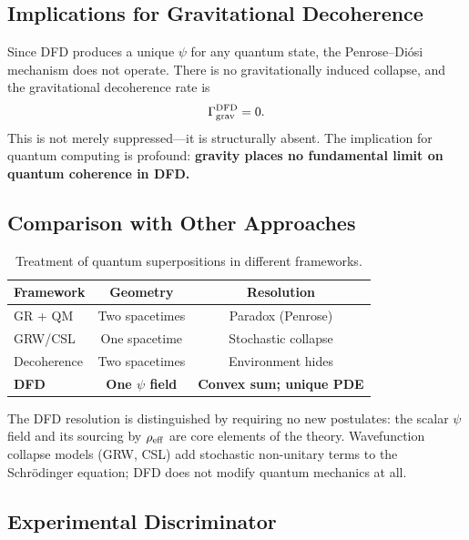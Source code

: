 \documentclass[aps,prd,twocolumn,superscriptaddress,nofootinbib]{revtex4-2}
\begin{document}
\subsection{Implications for Gravitational Decoherence}

Since DFD produces a unique $\psi$ for any quantum state, the
Penrose--Di\'osi mechanism does not operate. There is no gravitationally
induced collapse, and the gravitational decoherence rate is
\begin{equation}
\Gamma_{\rm grav}^{\rm DFD} = 0.
\end{equation}
This is not merely suppressed---it is structurally absent. The
implication for quantum computing is profound: \textbf{gravity places no
fundamental limit on quantum coherence in DFD.}

\subsection{Comparison with Other Approaches}

\begin{table}[h]
\caption{Treatment of quantum superpositions in different frameworks.}
\label{tab:approaches}
\begin{ruledtabular}
\begin{tabular}{lcc}
\textbf{Framework} & \textbf{Geometry} & \textbf{Resolution} \\
\hline
GR + QM & Two spacetimes & Paradox (Penrose) \\
GRW/CSL & One spacetime & Stochastic collapse \\
Decoherence & Two spacetimes & Environment hides \\
\textbf{DFD} & \textbf{One $\psi$ field} & \textbf{Convex sum; unique PDE} \\
\end{tabular}
\end{ruledtabular}
\end{table}

The DFD resolution is distinguished by requiring no new postulates: the
scalar $\psi$ field and its sourcing by $\rho_{\rm eff}$ are core
elements of the theory. Wavefunction collapse models (GRW, CSL) add
stochastic non-unitary terms to the Schr\"odinger equation; DFD does not
modify quantum mechanics at all.

\subsection{Experimental Discriminator}
\end{document}
